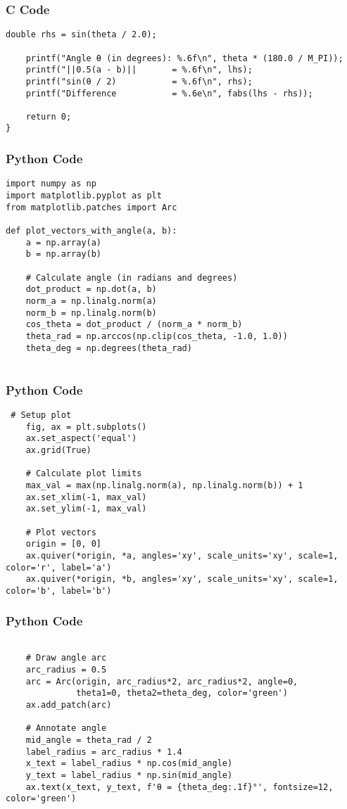 \documentclass{beamer}
\begin{document}
 

\begin{frame}[fragile]
\frametitle{C Code}
\begin{lstlisting}
double rhs = sin(theta / 2.0);

    printf("Angle θ (in degrees): %.6f\n", theta * (180.0 / M_PI));
    printf("||0.5(a - b)||       = %.6f\n", lhs);
    printf("sin(θ / 2)           = %.6f\n", rhs);
    printf("Difference           = %.6e\n", fabs(lhs - rhs));

    return 0;
}
\end{lstlisting}
\end{frame}
\begin{frame}[fragile]
\frametitle{Python Code}
\begin{lstlisting}
import numpy as np
import matplotlib.pyplot as plt
from matplotlib.patches import Arc

def plot_vectors_with_angle(a, b):
    a = np.array(a)
    b = np.array(b)

    # Calculate angle (in radians and degrees)
    dot_product = np.dot(a, b)
    norm_a = np.linalg.norm(a)
    norm_b = np.linalg.norm(b)
    cos_theta = dot_product / (norm_a * norm_b)
    theta_rad = np.arccos(np.clip(cos_theta, -1.0, 1.0))
    theta_deg = np.degrees(theta_rad)


    \end{lstlisting}
\end{frame}
\begin{frame}[fragile]
    \frametitle{Python Code}
    \begin{lstlisting}
 # Setup plot
    fig, ax = plt.subplots()
    ax.set_aspect('equal')
    ax.grid(True)

    # Calculate plot limits
    max_val = max(np.linalg.norm(a), np.linalg.norm(b)) + 1
    ax.set_xlim(-1, max_val)
    ax.set_ylim(-1, max_val)

    # Plot vectors
    origin = [0, 0]
    ax.quiver(*origin, *a, angles='xy', scale_units='xy', scale=1, color='r', label='a')
    ax.quiver(*origin, *b, angles='xy', scale_units='xy', scale=1, color='b', label='b')

    \end{lstlisting}
\end{frame}
 \begin{frame}[fragile]
    \frametitle{ Python Code}
    \begin{lstlisting}

    # Draw angle arc
    arc_radius = 0.5
    arc = Arc(origin, arc_radius*2, arc_radius*2, angle=0,
              theta1=0, theta2=theta_deg, color='green')
    ax.add_patch(arc)

    # Annotate angle
    mid_angle = theta_rad / 2
    label_radius = arc_radius * 1.4
    x_text = label_radius * np.cos(mid_angle)
    y_text = label_radius * np.sin(mid_angle)
    ax.text(x_text, y_text, f'θ = {theta_deg:.1f}°', fontsize=12, color='green')
\end{lstlisting}
\end{frame}
\end{document}
